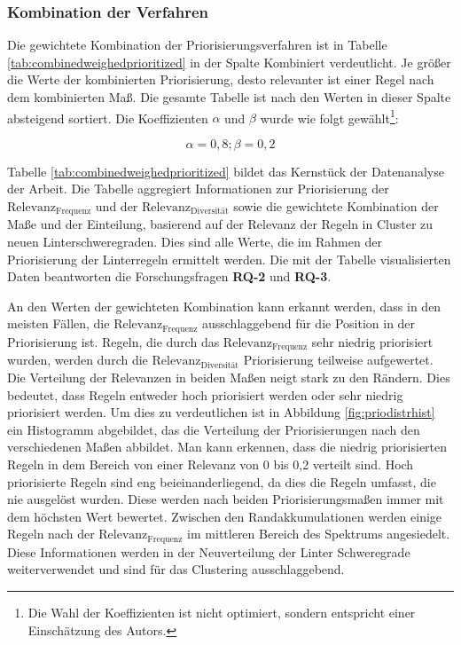 \subsubsection{Kombination der Verfahren} \label{sec:kombinationderverfahren}
Die gewichtete Kombination der Priorisierungsverfahren ist in Tabelle \ref{tab:combinedweighedprioritized} in der Spalte Kombiniert verdeutlicht. Je größer die Werte der kombinierten Priorisierung, desto relevanter ist einer Regel nach dem kombinierten Maß. Die gesamte Tabelle ist nach den Werten in dieser Spalte absteigend sortiert. Die Koeffizienten $\alpha$ und $\beta$ wurde wie folgt gewählt\footnote{Die Wahl der Koeffizienten ist nicht optimiert, sondern entspricht einer Einschätzung des Autors.}:

\[
\alpha = 0,8 ; \beta = 0,2
\]

Tabelle \ref{tab:combinedweighedprioritized} bildet das Kernstück der Datenanalyse der Arbeit. Die Tabelle aggregiert Informationen zur Priorisierung der $\text{Relevanz}_\text{Frequenz}$ und der $\text{Relevanz}_\text{Diversität}$ sowie die gewichtete Kombination der Maße und der Einteilung, basierend auf der Relevanz der Regeln in Cluster zu neuen Linterschweregraden. Dies sind alle Werte, die im Rahmen der Priorisierung der Linterregeln ermittelt werden. Die mit der Tabelle visualisierten Daten beantworten die Forschungsfragen \textbf{RQ-2} und \textbf{RQ-3}.

An den Werten der gewichteten Kombination kann erkannt werden, dass in den meisten Fällen, die $\text{Relevanz}_\text{Frequenz}$ ausschlaggebend für die Position in der Priorisierung ist. Regeln, die durch das $\text{Relevanz}_\text{Frequenz}$ sehr niedrig priorisiert wurden, werden durch die $\text{Relevanz}_\text{Diversität}$ Priorisierung teilweise aufgewertet. Die Verteilung der Relevanzen in beiden Maßen neigt stark zu den Rändern. Dies bedeutet, dass Regeln entweder hoch priorisiert werden oder sehr niedrig priorisiert werden. Um dies zu verdeutlichen ist in Abbildung \ref{fig:priodistrhist} ein Histogramm abgebildet, das die Verteilung der Priorisierungen nach den verschiedenen Maßen abbildet. Man kann erkennen, dass die niedrig priorisierten Regeln in dem Bereich von einer Relevanz von 0 bis 0,2 verteilt sind. Hoch priorisierte Regeln sind eng beieinanderliegend, da dies die Regeln umfasst, die nie ausgelöst wurden. Diese werden nach beiden Priorisierungsmaßen immer mit dem höchsten Wert bewertet. Zwischen den Randakkumulationen werden einige Regeln nach der $\text{Relevanz}_\text{Frequenz}$ im mittleren Bereich des Spektrums angesiedelt. Diese Informationen werden in der Neuverteilung der Linter Schweregrade weiterverwendet und sind für das Clustering ausschlaggebend.


